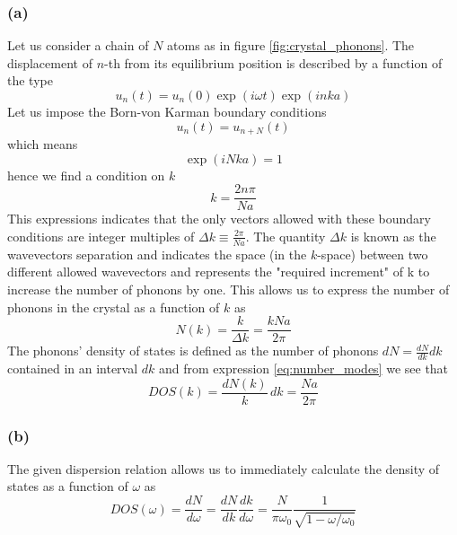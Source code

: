 \subsubsection*{(a)}
Let us consider a chain of $N$ atoms as in figure \ref{fig:crystal_phonons}. The displacement of $n$-th from its equilibrium position is described by a function of the type
\begin{equation*}
    u_n(t) = u_n(0) \exp(i\omega t) \exp(inka)
\end{equation*}
Let us impose the Born-von Karman boundary conditions 
\begin{equation*}
    u_n(t) = u_{n+N}(t)
\end{equation*}
which means
\begin{equation*}
    \exp(iNka) = 1
\end{equation*}
hence we find a condition on $k$
\begin{equation*}
    k = \frac{2n\pi}{N a}
\end{equation*}
This expressions indicates that the only vectors allowed with these boundary conditions are integer multiples of $\Delta k \equiv \frac{2\pi}{Na}$. The quantity $\Delta k$ is known as the 
wavevectors separation and indicates the space (in the $k$-space) between two different allowed wavevectors and represents the "required increment" of k to increase the number of phonons by one. 
This allows us to express the number of phonons in the crystal as a function of $k$ as 
\begin{equation}
    N(k) = \frac{k}{\Delta k} = \frac{kNa}{2\pi}
    \label{eq:number_modes}
\end{equation}
The phonons' density of states is defined as the number of phonons $dN = \frac{dN}{dk} dk$ contained in an interval $dk$ and from expression \ref{eq:number_modes} we see that
\begin{equation*}
    DOS(k) = \frac{dN(k)}{k} \, dk = \frac{Na}{2\pi}
\end{equation*}
\subsubsection*{(b)}
The given dispersion relation allows us to immediately calculate the density of states as a function of $\omega$ as
\begin{equation*}
    DOS(\omega) = \frac{dN}{d\omega} = \frac{dN}{dk}\frac{dk}{d\omega} = \frac{N}{\pi \omega_0} \frac{1}{\sqrt{1 - \omega/\omega_0}}
\end{equation*}

